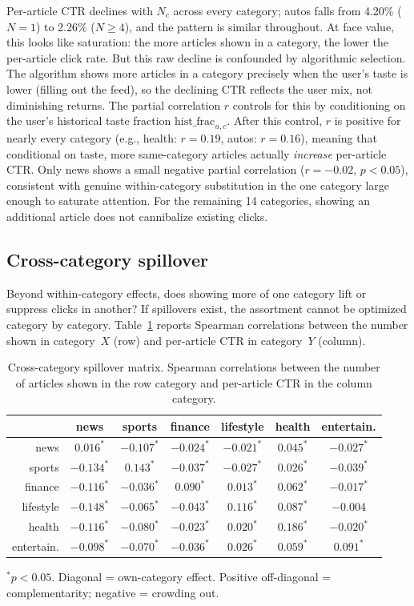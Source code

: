 \documentclass[11pt]{article}
\begin{document}
Per-article CTR declines with $N_c$ across every category; autos falls from 4.20\% ($N{=}1$) to 2.26\% ($N{\geq}4$), and the pattern is similar throughout. At face value, this looks like saturation: the more articles shown in a category, the lower the per-article click rate. But this raw decline is confounded by algorithmic selection. The algorithm shows more articles in a category precisely when the user's taste is lower (filling out the feed), so the declining CTR reflects the user mix, not diminishing returns. The partial correlation $r$ controls for this by conditioning on the user's historical taste fraction $\text{hist\_frac}_{u,c}$. After this control, $r$ is positive for nearly every category (e.g., health: $r = 0.19$, autos: $r = 0.16$), meaning that conditional on taste, more same-category articles actually \emph{increase} per-article CTR. Only news shows a small negative partial correlation ($r = -0.02$, $p < 0.05$), consistent with genuine within-category substitution in the one category large enough to saturate attention. For the remaining 14 categories, showing an additional article does not cannibalize existing clicks.

\subsection{Cross-category spillover}

Beyond within-category effects, does showing more of one category lift or suppress clicks in another? If spillovers exist, the assortment cannot be optimized category by category. Table~\ref{tab:spillover} reports Spearman correlations between the number shown in category~$X$ (row) and per-article CTR in category~$Y$ (column).

\begin{table}[ht]
\centering
\caption{Cross-category spillover matrix. Spearman correlations between the number of articles shown in the row category and per-article CTR in the column category.}
\label{tab:spillover}
\small
\begin{tabular}{r|cccccc}
\toprule
& news & sports & finance & lifestyle & health & entertain. \\
\midrule
news & $0.016^*$ & $-0.107^*$ & $-0.024^*$ & $-0.021^*$ & $0.045^*$ & $-0.027^*$ \\
sports & $-0.134^*$ & $0.143^*$ & $-0.037^*$ & $-0.027^*$ & $0.026^*$ & $-0.039^*$ \\
finance & $-0.116^*$ & $-0.036^*$ & $0.090^*$ & $0.013^*$ & $0.062^*$ & $-0.017^*$ \\
lifestyle & $-0.148^*$ & $-0.065^*$ & $-0.043^*$ & $0.116^*$ & $0.087^*$ & $-0.004$ \\
health & $-0.116^*$ & $-0.080^*$ & $-0.023^*$ & $0.020^*$ & $0.186^*$ & $-0.020^*$ \\
entertain. & $-0.098^*$ & $-0.070^*$ & $-0.036^*$ & $0.026^*$ & $0.059^*$ & $0.091^*$ \\
\bottomrule
\end{tabular}

{\footnotesize $^*p < 0.05$. Diagonal = own-category effect. Positive off-diagonal = complementarity; negative = crowding out.}
\end{table}
\FloatBarrier
\end{document}

